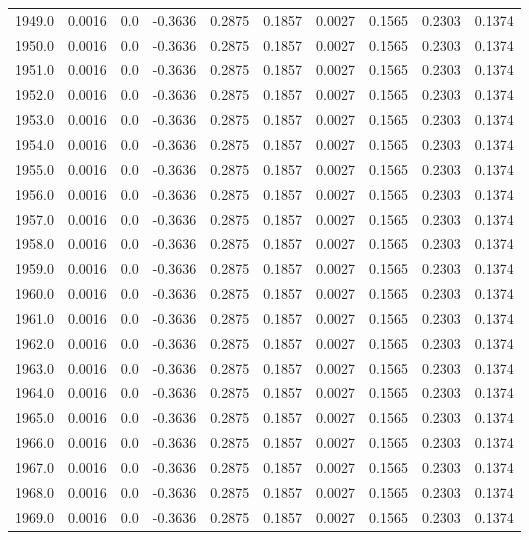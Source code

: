 \begin{longtable}{lrrrrrrrrr}
1949.0 & 0.0016 & 0.0 & -0.3636 & 0.2875 & 0.1857 & 0.0027 & 0.1565 & 0.2303 & 0.1374 \\
1950.0 & 0.0016 & 0.0 & -0.3636 & 0.2875 & 0.1857 & 0.0027 & 0.1565 & 0.2303 & 0.1374 \\
1951.0 & 0.0016 & 0.0 & -0.3636 & 0.2875 & 0.1857 & 0.0027 & 0.1565 & 0.2303 & 0.1374 \\
1952.0 & 0.0016 & 0.0 & -0.3636 & 0.2875 & 0.1857 & 0.0027 & 0.1565 & 0.2303 & 0.1374 \\
1953.0 & 0.0016 & 0.0 & -0.3636 & 0.2875 & 0.1857 & 0.0027 & 0.1565 & 0.2303 & 0.1374 \\
1954.0 & 0.0016 & 0.0 & -0.3636 & 0.2875 & 0.1857 & 0.0027 & 0.1565 & 0.2303 & 0.1374 \\
1955.0 & 0.0016 & 0.0 & -0.3636 & 0.2875 & 0.1857 & 0.0027 & 0.1565 & 0.2303 & 0.1374 \\
1956.0 & 0.0016 & 0.0 & -0.3636 & 0.2875 & 0.1857 & 0.0027 & 0.1565 & 0.2303 & 0.1374 \\
1957.0 & 0.0016 & 0.0 & -0.3636 & 0.2875 & 0.1857 & 0.0027 & 0.1565 & 0.2303 & 0.1374 \\
1958.0 & 0.0016 & 0.0 & -0.3636 & 0.2875 & 0.1857 & 0.0027 & 0.1565 & 0.2303 & 0.1374 \\
1959.0 & 0.0016 & 0.0 & -0.3636 & 0.2875 & 0.1857 & 0.0027 & 0.1565 & 0.2303 & 0.1374 \\
1960.0 & 0.0016 & 0.0 & -0.3636 & 0.2875 & 0.1857 & 0.0027 & 0.1565 & 0.2303 & 0.1374 \\
1961.0 & 0.0016 & 0.0 & -0.3636 & 0.2875 & 0.1857 & 0.0027 & 0.1565 & 0.2303 & 0.1374 \\
1962.0 & 0.0016 & 0.0 & -0.3636 & 0.2875 & 0.1857 & 0.0027 & 0.1565 & 0.2303 & 0.1374 \\
1963.0 & 0.0016 & 0.0 & -0.3636 & 0.2875 & 0.1857 & 0.0027 & 0.1565 & 0.2303 & 0.1374 \\
1964.0 & 0.0016 & 0.0 & -0.3636 & 0.2875 & 0.1857 & 0.0027 & 0.1565 & 0.2303 & 0.1374 \\
1965.0 & 0.0016 & 0.0 & -0.3636 & 0.2875 & 0.1857 & 0.0027 & 0.1565 & 0.2303 & 0.1374 \\
1966.0 & 0.0016 & 0.0 & -0.3636 & 0.2875 & 0.1857 & 0.0027 & 0.1565 & 0.2303 & 0.1374 \\
1967.0 & 0.0016 & 0.0 & -0.3636 & 0.2875 & 0.1857 & 0.0027 & 0.1565 & 0.2303 & 0.1374 \\
1968.0 & 0.0016 & 0.0 & -0.3636 & 0.2875 & 0.1857 & 0.0027 & 0.1565 & 0.2303 & 0.1374 \\
1969.0 & 0.0016 & 0.0 & -0.3636 & 0.2875 & 0.1857 & 0.0027 & 0.1565 & 0.2303 & 0.1374 \\

\end{longtable}
